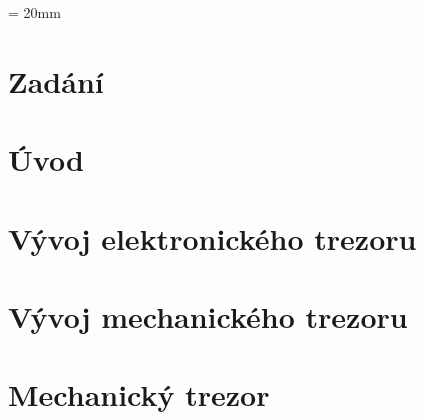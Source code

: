 \documentclass{template/DMP}
\renewcommand{\headrulewidth}{ 0PT }
\begin{document}
{\tableofcontents %

\headsep = 20mm

\newpage

\setcounter{figure}{0}
\setcounter{table}{0}

\pagestyle{empty}
\pagestyle{plain}

\chapter{Zadání}


\chapter{Úvod}


\chapter{Vývoj elektronického trezoru}
\label{E-vyvoj}






\chapter{Vývoj mechanického trezoru}
\label{M-vyvoj}





\chapter{Mechanický trezor} 
\label{M3}

}
\end{document}
